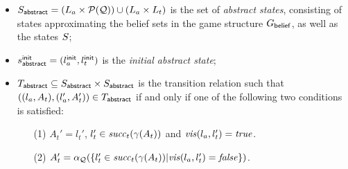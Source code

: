 \begin{itemize}
\item $S_{\mathsf{abstract}} = (L_a \times \mathcal P(\mathcal{Q})) \cup (L_a \times L_t)$  is the set of \emph{abstract states}, consisting of states approximating the belief sets in the game structure $G_{\mathsf{belief}}$, as well as the states $S$;
\item $s^{\mathsf{init}}_{\mathsf{abstract}} = (l_a^{\mathsf{init}},l_t^{\mathsf{init}})$ is the \emph{initial abstract state};
\item $T_{\mathsf{abstract}} \subseteq S_{\mathsf{abstract}} \times S_{\mathsf{abstract}}$ is the transition relation such that $((l_a, A_t),(l_a', A_t')) \in T_{\mathsf{abstract}}$ if and only if one of the following two conditions is satisfied:
\begin{itemize}
\item[(1)] $A_t' = l_t'$, $l_t' \in \mathit{succ}_t(\gamma(A_t))$ and $\mathit{vis}(l_a,l_t') = \mathit{true}$.

\item[(2)] $A_t' = \alpha_{\mathcal{Q}}(\{l_t' \in \mathit{succ}_t(\gamma(A_t))  |  \mathit{vis}(l_a,l_t') = \mathit{false}\})$.



\end{itemize}
\end{itemize}

